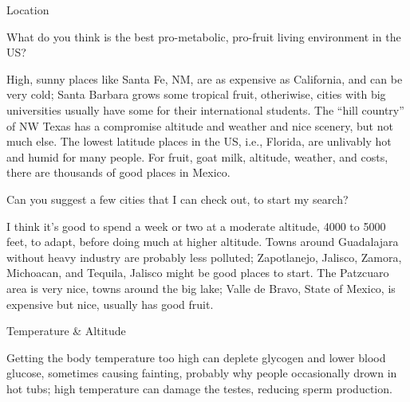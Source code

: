 \documentclass[11pt,oneside,openany,extrafontsizes]{memoir}
\begin{document}
\begin{emailexchange}{Location}

    \begin{question}
        What do you think is the best pro-metabolic, pro-fruit living environment in the US?
    \end{question}

    \begin{answer}
        High, sunny places like Santa Fe, NM, are as expensive as California, and can be very cold; Santa Barbara grows some tropical fruit, otheriwise, cities with big universities usually have some for their international students. The \enquote{hill country} of NW Texas has a compromise altitude and weather and nice scenery, but not much else. The lowest latitude places in the US, i.e., Florida, are unlivably hot and humid for many people. For fruit, goat milk, altitude, weather, and costs, there are thousands of good places in Mexico.
    \end{answer}

    \begin{question}
        Can you suggest a few cities that I can check out, to start my search?
    \end{question}

    \begin{answer}
        I think it's good to spend a week or two at a moderate altitude, 4000 to 5000 feet, to adapt, before doing much at higher altitude. Towns around Guadalajara without heavy industry are probably less polluted; Zapotlanejo, Jalisco, Zamora, Michoacan, and Tequila, Jalisco might be good places to start. The Patzcuaro area is very nice, towns around the big lake; Valle de Bravo, State of Mexico, is expensive but nice, usually has good fruit.
    \end{answer}
\end{emailexchange}

\begin{standalonequote}{Temperature \& Altitude}

    \begin{answer}
      Getting the body temperature too high can deplete glycogen and lower blood glucose, sometimes causing fainting, probably why people occasionally drown in hot tubs; high temperature can damage the testes, reducing sperm production.
    \end{answer}
\end{standalonequote}
\end{document}
